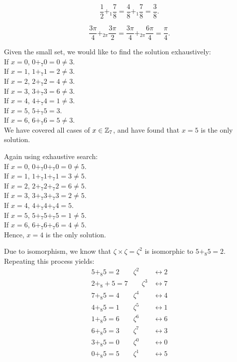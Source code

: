 \documentclass[12pt]{article}
\begin{document}
\begin{problem}[1.25]
	\[
	\frac{1}{2} +_1 \frac{7}{8} = \frac{4}{8} +_1 \frac{7}{8} =\frac{3}{8}
	.\] 
\end{problem}
\begin{problem}[1.26]
	\[
		\frac{3\pi}{4} +_{2\pi} \frac{3\pi}{2} = \frac{3\pi}{4} +_{2\pi} \frac{6\pi}{4} = \frac{\pi}{4}
	.\] 
\end{problem}

\begin{problem}[1.31]
Given the small set, we would like to find the solution exhaustively:\\
If $x=0$,  $0+_{7} 0 = 0 \neq 3$.\\
If $x = 1$, $1 +_{7} 1 = 2 \neq 3$.\\
If $x = 2$, $2 +_{7} 2 = 4 \neq 3$.\\
If $x = 3$, $3 +_{7} 3 = 6 \neq 3$.\\
If $x = 4$, $4 +_{7} 4 = 1 \neq 3$.\\
If $x = 5$, $5 +_{7} 5 = 3$.\\
If $x = 6$, $6 +_{7} 6 = 5 \neq 3$.\\
We have covered all cases of $x \in \mathbb{Z}_7$, and have found that $x=5$ is the only solution.
\end{problem}
\begin{problem}[1.32]
Again using exhaustive search:\\
If $x=0$,  $0+_{7} 0 +_{7} 0  = 0 \neq 5$.\\
If $x=1$,  $1+_{7} 1 +_{7} 1  = 3 \neq 5$.\\
If $x=2$,  $2+_{7} 2 +_{7} 2  = 6 \neq 5$.\\
If $x=3$,  $3+_{7} 3 +_{7} 3  = 2 \neq 5$.\\
If $x=4$,  $4+_{7} 4 +_{7} 4  = 5$.\\
If $x=5$,  $5+_{7} 5 +_{7} 5  = 1 \neq 5$.\\
If $x=6$,  $6+_{7} 6 +_{7} 6  = 4 \neq 5$.\\
Hence, $x=4$ is the only solution.
\end{problem}
\begin{problem}[1.35]
Due to isomorphism, we know that $\zeta \times \zeta = \zeta^2$ is isomorphic to $5+_{8}5 = 2$. Repeating this process yields:
\begin{align*}
	5+_{8} 5 = 2 \qquad \zeta^2 & \leftrightarrow 2\\
	2+_{8} +5 = 7 \qquad \zeta^3 & \leftrightarrow 7\\
	7 +_{8} 5 = 4 \qquad \zeta^{4} & \leftrightarrow 4\\
	4 +_{8} 5 = 1 \qquad \zeta^{5} & \leftrightarrow 1\\
	1+_{8} 5 = 6 \qquad \zeta^{6} & \leftrightarrow 6\\
	6+_{8} 5 = 3 \qquad \zeta^{7} & \leftrightarrow 3\\
	3 +_{8} 5 = 0 \qquad \zeta^{0} &\leftrightarrow 0\\
	0+_{8} 5 = 5 \qquad  \zeta^{1} & \leftrightarrow 5\\	
\end{align*}
\end{problem}
\end{document}
